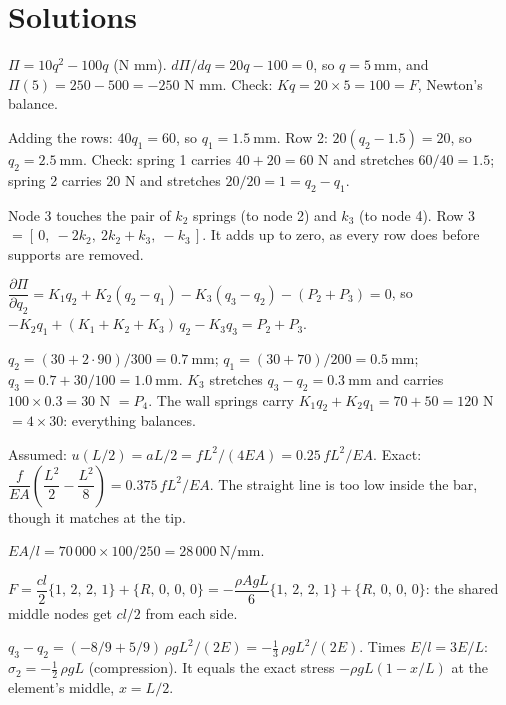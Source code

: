 \documentclass[11pt]{article}
\newcommand{\mm}{\ \mathrm{mm}}
\newcommand{\Nmm}{\ \mathrm{N/mm}}
\begin{document}
\section*{Solutions}\label{solutions}

$\Pi = 10q^2 - 100q$ (N mm). $d\Pi/dq = 20q - 100 = 0$, so $q = 5\mm$, and $\Pi(5) = 250 - 500 = -250$ N mm.
Check: $Kq = 20\times 5 = 100 = F$, Newton's balance.

Adding the rows: $40q_1 = 60$, so $q_1 = 1.5\mm$. Row 2: $20(q_2 - 1.5) = 20$, so $q_2 = 2.5\mm$.
Check: spring 1 carries $40 + 20 = 60$ N and stretches $60/40 = 1.5$; spring 2 carries 20 N and stretches
$20/20 = 1 = q_2 - q_1$.

Node 3 touches the pair of $k_2$ springs (to node 2) and $k_3$ (to node 4). Row 3 $= [\,0,\ -2k_2,\ 2k_2 + k_3,\ -k_3\,]$.
It adds up to zero, as every row does before supports are removed.

$\dfrac{\partial\Pi}{\partial q_2} = K_1 q_2 + K_2(q_2 - q_1) - K_3(q_3 - q_2) - (P_2 + P_3) = 0$, so
$-K_2 q_1 + (K_1 + K_2 + K_3)\,q_2 - K_3 q_3 = P_2 + P_3$.

$q_2 = (30 + 2\cdot 90)/300 = 0.7\mm$; $q_1 = (30 + 70)/200 = 0.5\mm$; $q_3 = 0.7 + 30/100 = 1.0\mm$.
$K_3$ stretches $q_3 - q_2 = 0.3\mm$ and carries $100\times0.3 = 30$ N $= P_4$. The wall springs carry
$K_1 q_2 + K_2 q_1 = 70 + 50 = 120$ N $= 4\times30$: everything balances.

Assumed: $u(L/2) = aL/2 = fL^2/(4EA) = 0.25\,fL^2/EA$. Exact: $\dfrac{f}{EA}\left(\dfrac{L^2}{2} - \dfrac{L^2}{8}\right)
= 0.375\,fL^2/EA$. The straight line is too low inside the bar, though it matches at the tip.

$EA/l = 70\,000\times100/250 = 28\,000\Nmm$.

$F = \dfrac{cl}{2}\{1,\,2,\,2,\,1\} + \{R,\,0,\,0,\,0\} = -\dfrac{\rho A g L}{6}\{1,\,2,\,2,\,1\} + \{R,\,0,\,0,\,0\}$: the shared middle nodes get $cl/2$ from each side.

$q_3 - q_2 = (-8/9 + 5/9)\,\rho g L^2/(2E) = -\tfrac13\,\rho g L^2/(2E)$. Times $E/l = 3E/L$:
$\sigma_2 = -\tfrac12\,\rho g L$ (compression). It equals the exact stress $-\rho g L(1 - x/L)$ at the element's middle,
$x = L/2$.
\end{document}
